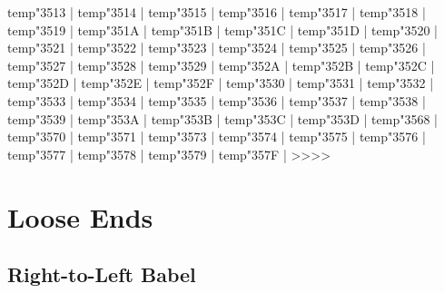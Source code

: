 {{\:temp{\mathchar"3513} |%
\:temp{\mathchar"3514} |%
\:temp{\mathchar"3515} |%
\:temp{\mathchar"3516} |%
\:temp{\mathchar"3517} |%
\:temp{\mathchar"3518} |%
\:temp{\mathchar"3519} |%
\:temp{\mathchar"351A} |%
\:temp{\mathchar"351B} |%
\:temp{\mathchar"351C} |%
\:temp{\mathchar"351D} |%
\:temp{\mathchar"3520} |%
\:temp{\mathchar"3521} |%
\:temp{\mathchar"3522} |%
\:temp{\mathchar"3523} |%
\:temp{\mathchar"3524} |%
\:temp{\mathchar"3525} |%
\:temp{\mathchar"3526} |%
\:temp{\mathchar"3527} |%
\:temp{\mathchar"3528} |%
\:temp{\mathchar"3529} |%
\:temp{\mathchar"352A} |%
\:temp{\mathchar"352B} |%
\:temp{\mathchar"352C} |%
\:temp{\mathchar"352D} |%
\:temp{\mathchar"352E} |%
\:temp{\mathchar"352F} |%
\:temp{\mathchar"3530} |%
\:temp{\mathchar"3531} |%
\:temp{\mathchar"3532} |%
\:temp{\mathchar"3533} |%
\:temp{\mathchar"3534} |%
\:temp{\mathchar"3535} |%
\:temp{\mathchar"3536} |%
\:temp{\mathchar"3537} |%
\:temp{\mathchar"3538} |%
\:temp{\mathchar"3539} |%
\:temp{\mathchar"353A} |%
\:temp{\mathchar"353B} |%
\:temp{\mathchar"353C} |%
\:temp{\mathchar"353D} |%
\:temp{\mathchar"3568} |%
\:temp{\mathchar"3570} |%
\:temp{\mathchar"3571} |%
\:temp{\mathchar"3573} |%
\:temp{\mathchar"3574} |%
\:temp{\mathchar"3575} |%
\:temp{\mathchar"3576} |%
\:temp{\mathchar"3577} |%
\:temp{\mathchar"3578} |%
\:temp{\mathchar"3579} |%
\:temp{\mathchar"357F} |%
>>>>




\chapter{Loose Ends}


\section{Right-to-Left Babel}



}}
